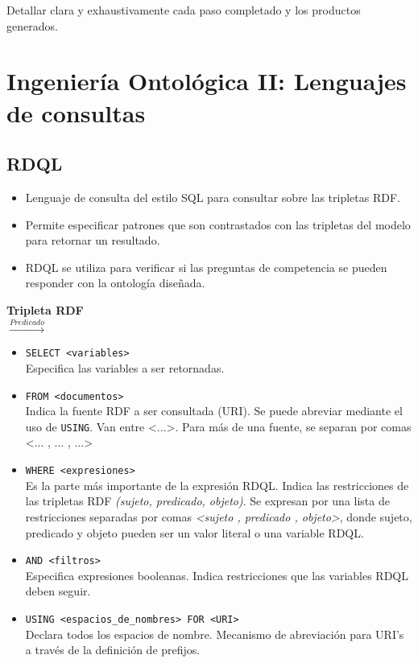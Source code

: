 \documentclass[a4paper,10pt,spanish,oneside]{article}
\begin{document}
Detallar clara y exhaustivamente cada paso completado y los productos generados.

\section{Ingeniería Ontológica II: Lenguajes de consultas}

\subsection{RDQL}

\begin{itemize}
\item Lenguaje de consulta del estilo SQL para consultar sobre las tripletas RDF.

\item Permite especificar patrones que son contrastados con las tripletas del modelo para retornar un resultado.

\item RDQL se utiliza para verificar si las preguntas de competencia se pueden responder con la ontología diseñada.
\end{itemize}

\begin{center}
\textbf{Tripleta RDF} \\

 $\stackrel{Predicado}{\rightarrow}$ 
\end{center}

\begin{itemize}
\item \texttt{SELECT <variables>} \\ Especifica las variables a ser retornadas.

\item \texttt{FROM <documentos>} \\ Indica la fuente RDF a ser consultada (URI). Se puede abreviar mediante el uso de \texttt{USING}. Van entre <...>. Para más de una fuente, se separan por comas <... , ... , ...>

\item \texttt{WHERE <expresiones>} \\ Es la parte más importante de la expresión RDQL. Indica las restricciones de las tripletas RDF \textit{(sujeto, predicado, objeto)}. Se expresan por una lista de restricciones separadas por comas \textit{<sujeto , predicado , objeto>}, donde sujeto, predicado y objeto pueden ser un valor literal o una variable RDQL.

\item \texttt{AND <filtros>} \\ Especifica expresiones booleanas. Indica restricciones que las variables RDQL deben seguir.

\item \texttt{USING <espacios\_de\_nombres>\ FOR <URI>} \\ Declara todos los espacios de nombre. Mecanismo de abreviación para URI's a través de la definición de prefijos.
\end{itemize}
\end{document}
